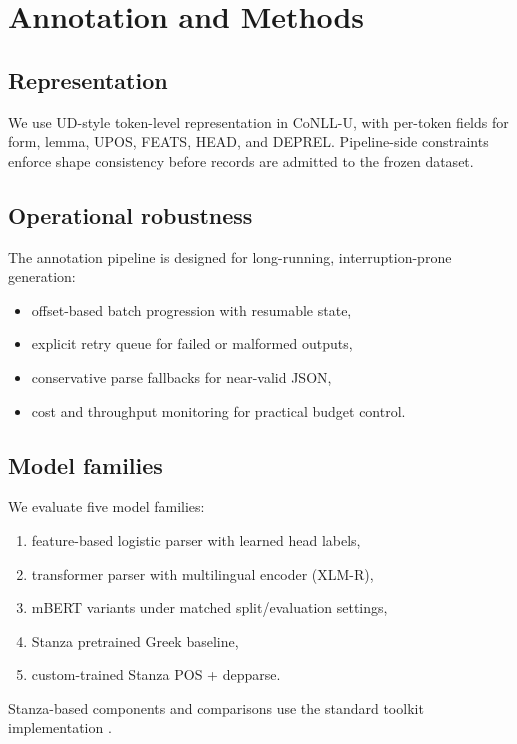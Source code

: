 \section{Annotation and Methods}

\subsection{Representation}

We use UD-style token-level representation in CoNLL-U, with per-token fields for form, lemma, UPOS, FEATS, HEAD, and DEPREL. Pipeline-side constraints enforce shape consistency before records are admitted to the frozen dataset.

\subsection{Operational robustness}

The annotation pipeline is designed for long-running, interruption-prone generation:
\begin{itemize}[leftmargin=1.25em]
  \item offset-based batch progression with resumable state,
  \item explicit retry queue for failed or malformed outputs,
  \item conservative parse fallbacks for near-valid JSON,
  \item cost and throughput monitoring for practical budget control.
\end{itemize}

\subsection{Model families}

We evaluate five model families:
\begin{enumerate}[leftmargin=1.25em]
  \item feature-based logistic parser with learned head labels,
  \item transformer parser with multilingual encoder (XLM-R),
  \item mBERT variants under matched split/evaluation settings,
  \item Stanza pretrained Greek baseline,
  \item custom-trained Stanza POS + depparse.
\end{enumerate}

Stanza-based components and comparisons use the standard toolkit implementation \cite{qi2020stanza}.
